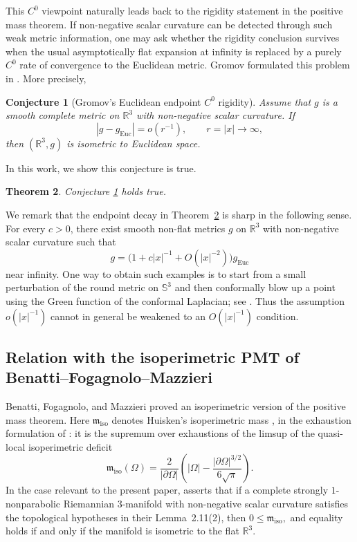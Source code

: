 \documentclass[11pt]{amsart}
\numberwithin{equation}{section}
\newtheorem{theorem}{Theorem}[section]
\newtheorem{conjecture}[theorem]{Conjecture}
\theoremstyle{definition}
\newcommand{\R}{\mathbb R}
\newcommand{\Euc}{\mathrm{Euc}}
\begin{document}
This $C^0$ viewpoint naturally leads back to the rigidity statement in the positive mass theorem.  If non-negative scalar curvature can be detected through such weak metric information, one may ask whether the rigidity conclusion survives when the usual asymptotically flat expansion at infinity is replaced by a purely $C^0$ rate of convergence to the Euclidean metric.  Gromov formulated this problem in \cite[Section~3.11]{GromovFourLectures}. More precisely,

\begin{conjecture}[Gromov's Euclidean endpoint $C^0$ rigidity]\label{conj:gromov}
Assume that $g$ is a smooth complete metric on $\R^3$ with non-negative scalar curvature.  If
$$
        |g-g_{\Euc}|=o(r^{-1}),\qquad r=|x|\to\infty,
$$
then $(\R^3,g)$ is isometric to Euclidean space.    
\end{conjecture}

In this work, we show this conjecture is true.
\begin{theorem}\label{thm:intro-main}
Conjecture \ref{conj:gromov} holds true.
\end{theorem}

We remark that the endpoint decay in Theorem~\ref{thm:intro-main} is sharp in the following sense.  For every
$c>0$, there exist smooth non-flat metrics $g$ on $\R^3$ with non-negative scalar curvature such that
$$
        g=\bigl(1+c|x|^{-1}+O(|x|^{-2})\bigr)g_{\Euc}
$$
near infinity.  One way to obtain such examples is to start from a small perturbation of the round
metric on $\mathbb S^3$ and then conformally blow up a point using the Green function of the
conformal Laplacian; see \cite[Remark~4]{MYrigidity}.  Thus the assumption
$o(|x|^{-1})$ cannot in general be weakened to an $O(|x|^{-1})$ condition.


\subsection{Relation with the isoperimetric PMT of Benatti--Fogagnolo--Mazzieri}

Benatti, Fogagnolo, and Mazzieri \cite{BFM} proved an isoperimetric version of the positive mass theorem. Here \(\mathfrak m_{\mathrm{iso}}\) denotes Huisken's isoperimetric mass \cite{HuiskenIsoMass}, in the exhaustion formulation of \cite[Definition~1.2]{BFM}: it is the supremum over exhaustions of the limsup of the quasi-local isoperimetric deficit
\[
        \mathfrak m_{\mathrm{iso}}(\Omega)
        =
        \frac{2}{|\partial\Omega|}
        \left(
        |\Omega|-\frac{|\partial\Omega|^{3/2}}{6\sqrt{\pi}}
        \right).
\] In the case relevant to the present paper, \cite[Theorem~2.14]{BFM} asserts that if a complete strongly $1$-nonparabolic Riemannian $3$-manifold with non-negative scalar curvature satisfies the topological hypotheses in their Lemma~2.11(2), then
$
        0\le \mathfrak m_{\mathrm{iso}},
$
and equality holds if and only if the manifold is isometric to the flat $\R^3$. 
\end{document}
